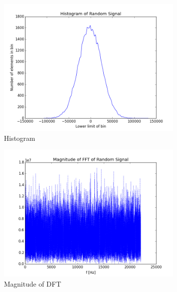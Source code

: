 \begin{figure}[htb]
	\centering		
	\begin{subfigure}[b]{0.49\linewidth}
        \centering
		\includegraphics[width=\linewidth]{files/random_hist.png}
        \caption{Histogram}
        \label{fig:random_hist}
	\end{subfigure} 
	\begin{subfigure}[b]{0.49\linewidth}
        \centering
		\includegraphics[width=\linewidth]{files/random_fft.png}
        \caption{Magnitude of DFT}
        \label{fig:random_fft}
	\end{subfigure}
    \begin{subfigure}[b]{0.49\linewidth}
        \centering

\end{subfigure}
\end{figure}
